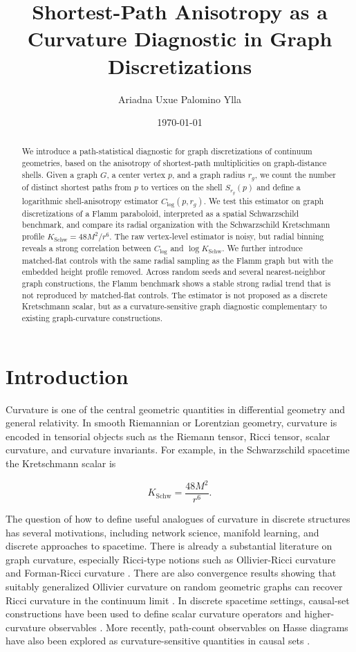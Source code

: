 \documentclass[11pt]{article}
\title{Shortest-Path Anisotropy as a Curvature Diagnostic in Graph Discretizations}
\author{Ariadna Uxue Palomino Ylla}
\date{\today}
\begin{document}
\maketitle

\begin{abstract}
We introduce a path-statistical diagnostic for graph discretizations of continuum geometries, based on the anisotropy of shortest-path multiplicities on graph-distance shells. Given a graph $G$, a center vertex $p$, and a graph radius $r_g$, we count the number of distinct shortest paths from $p$ to vertices on the shell $S_{r_g}(p)$ and define a logarithmic shell-anisotropy estimator $C_{\log}(p,r_g)$. We test this estimator on graph discretizations of a Flamm paraboloid, interpreted as a spatial Schwarzschild benchmark, and compare its radial organization with the Schwarzschild Kretschmann profile $K_{\mathrm{Schw}}=48M^2/r^6$. The raw vertex-level estimator is noisy, but radial binning reveals a strong correlation between $C_{\log}$ and $\log K_{\mathrm{Schw}}$. We further introduce matched-flat controls with the same radial sampling as the Flamm graph but with the embedded height profile removed. Across random seeds and several nearest-neighbor graph constructions, the Flamm benchmark shows a stable strong radial trend that is not reproduced by matched-flat controls. The estimator is not proposed as a discrete Kretschmann scalar, but as a curvature-sensitive graph diagnostic complementary to existing graph-curvature constructions.
\end{abstract}

\section{Introduction}

Curvature is one of the central geometric quantities in differential geometry and general relativity. In smooth Riemannian or Lorentzian geometry, curvature is encoded in tensorial objects such as the Riemann tensor, Ricci tensor, scalar curvature, and curvature invariants. For example, in the Schwarzschild spacetime the Kretschmann scalar is

\begin{equation}
K_{\mathrm{Schw}} = \frac{48M^2}{r^6}.
\end{equation}

The question of how to define useful analogues of curvature in discrete structures has several motivations, including network science, manifold learning, and discrete approaches to spacetime. There is already a substantial literature on graph curvature, especially Ricci-type notions such as Ollivier-Ricci curvature and Forman-Ricci curvature \cite{Ollivier2009,Forman2003,Samal2018}. There are also convergence results showing that suitably generalized Ollivier curvature on random geometric graphs can recover Ricci curvature in the continuum limit \cite{VanDerHoorn2021}. In discrete spacetime settings, causal-set constructions have been used to define scalar curvature operators and higher-curvature observables \cite{BenincasaDowker2010,DeBrito2023}. More recently, path-count observables on Hasse diagrams have also been explored as curvature-sensitive quantities in causal sets \cite{Alfyorov2026}.
\end{document}
